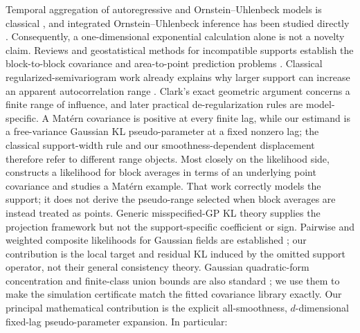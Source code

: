 \documentclass[11pt]{article}
\theoremstyle{remark}
\begin{document}
Temporal aggregation of autoregressive and Ornstein--Uhlenbeck models is
classical \citep{amemiya1972aggregation,stram1986aggregation}, and integrated
Ornstein--Uhlenbeck inference has been studied directly
\citep{folia2018aggregated}.  Consequently, a one-dimensional exponential
calculation alone is not a novelty claim.  Reviews and geostatistical methods
for incompatible supports establish the block-to-block covariance and
area-to-point prediction problems
\citep{gotway2002incompatible,kyriakidis2005areal}.  Classical
regularized-semivariogram work already explains why larger support can increase
an apparent autocorrelation range
\citep{clark1977regularization,bellehumeur1997aggregation}.  Clark's exact
geometric argument concerns a finite range of influence, and later practical
de-regularization rules are model-specific.  A Mat\'ern covariance is positive
at every finite lag, while our estimand is a free-variance Gaussian KL
pseudo-parameter at a fixed nonzero lag; the classical support-width rule and
our smoothness-dependent displacement therefore refer to different range
objects.  Most closely on the likelihood side,
\citet{fuentes2007approximate} constructs a likelihood for block averages in
terms of an underlying point covariance and studies a Mat\'ern example.  That
work correctly models the support; it does not derive the pseudo-range selected
when block averages are instead treated as points.  Generic misspecified-GP KL
theory \citep{bachoc2018misspecified} supplies the projection framework but not
the support-specific coefficient or sign. Pairwise and weighted composite
likelihoods for Gaussian fields are established
\citep{varin2011composite,bevilacqua2012weighted}; our contribution is the
local target and residual KL induced by the omitted support operator, not their
general consistency theory. Gaussian quadratic-form
concentration and finite-class union bounds are also standard
\citep{laurent2000quadratic,hsu2012quadratic}; we use them to make the
simulation certificate match the fitted covariance library exactly.  Our
principal mathematical contribution is the explicit all-smoothness,
\(d\)-dimensional fixed-lag pseudo-parameter expansion.  In particular:
\end{document}

